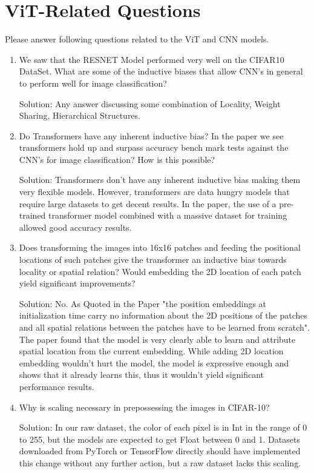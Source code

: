 \documentclass{article}
\begin{document}
\section{ViT-Related Questions}
\bigbreak
Please answer following questions related to the ViT and CNN models.
\begin{enumerate}[label=(\alph*)]
\color{black}
\item We saw that the RESNET Model performed very well on the CIFAR10 DataSet. What are some of the inductive biases that allow CNN's in general to perform well for image classification?\par
\color{blue}
Solution: Any answer discussing some combination of Locality, Weight Sharing, Hierarchical Structures.
\medbreak

\color{black}
\item Do Transformers have any inherent inductive bias? In the paper we see transformers hold up and surpass accuracy bench mark tests against the CNN's for image classification? How is this possible?\par
\color{blue}
Solution: Transformers don't have any inherent inductive bias making them very flexible models. However, transformers are data hungry models that require large datasets to get decent results. In the paper, the use of a pre-trained transformer model combined with a massive dataset for training allowed good accuracy results.
\medbreak

\color{black}
\item Does transforming the images into 16x16 patches and feeding the positional locations of such patches give the transformer an inductive bias towards locality or spatial relation? Would embedding the 2D location of each patch yield significant improvements?\par
\color{blue}
Solution: No. As Quoted in the Paper "the position embeddings at initialization time carry no information about the 2D positions of the patches and all spatial relations between the patches have to be learned from scratch". The paper found that the model is very clearly able to learn and attribute spatial location from the current embedding. While adding 2D location embedding wouldn't hurt the model, the model is expressive enough and shows that it already learns this, thus it wouldn't yield significant performance results.
\medbreak

\color{black}
\item Why is scaling necessary in prepossessing the images in CIFAR-10?\par
\color{blue} Solution: In our raw dataset, the color of each pixel is in Int in the range of 0 to 255, but the models are expected to get Float between 0 and 1. Datasets downloaded from PyTorch or TensorFlow directly should have implemented this change without any further action, but a raw dataset lacks this scaling.
\medbreak


\end{enumerate}
\end{document}

